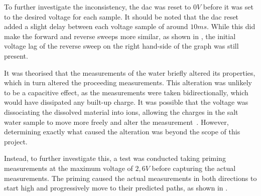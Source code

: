 To further investigate the inconsistency, the \gls{dac} was reset to $0V$ before it was set to the desired voltage for each sample.
It should be noted that the \gls{dac} reset added a slight delay between each voltage sample of around $10ms$. 
While this did make the forward and reverse sweeps more similar, as shown in , the initial voltage lag of the reverse sweep on the right hand-side of the graph was still present.

It was theorised that the measurements of the water briefly altered its properties, which in turn altered the proceeding measurements.
This alteration was unlikely to be a capacitive effect, as the measurements were taken bidirectionally, which would have dissipated any built-up charge.
It was possible that the voltage was dissociating the dissolved material into ions, allowing the charges in the salt water sample to move more freely and alter the measurement~\cite{ostdiek_inquiry_into_physics_2020}.
However, determining exactly what caused the alteration was beyond the scope of this project.

Instead, to further investigate this, a test was conducted taking priming measurements at the maximum voltage of $2,6V$ before capturing the actual measurements.
The priming caused the actual measurements in both directions to start high and progressively move to their predicted paths, as shown in .

